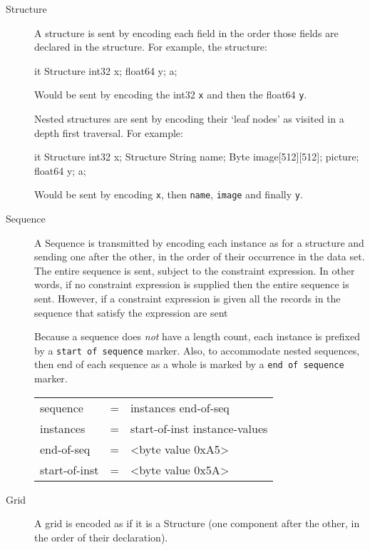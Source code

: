 \documentclass{article}
\begin{document}
\begin{description}
\item [Structure] A structure is sent by encoding each field in the order
  those fields are declared in the structure. For example, the structure:

\begin{vcode}{it}
Structure {
    int32 x;
    float64 y;
} a;
\end{vcode}

Would be sent by encoding the int32 \texttt{x} and then the float64
\texttt{y}. 

Nested structures are sent by encoding their `leaf nodes' as visited in a
depth first traversal. For example:

\begin{vcode}{it}
Structure {
    int32 x;
    Structure {
        String name;
        Byte image[512][512];
    } picture;
    float64 y;
} a;
\end{vcode}

Would be sent by encoding \texttt{x}, then \texttt{name}, \texttt{image} and
  finally \texttt{y}.

\item [Sequence] A Sequence is transmitted by encoding each instance as for a
  structure and sending one after the other, in the order of their occurrence
  in the data set. The entire sequence is sent, subject to the constraint
  expression. In other words, if no constraint expression is supplied then
  the entire sequence is sent. However, if a constraint expression is given
  all the records in the sequence that satisfy the expression are
  sent

  Because a sequence does \emph{not} have a length count, each instance
  is prefixed by a \texttt{start of sequence} marker. Also, to accommodate
  nested sequences, then end of each sequence as a whole is marked by a
  \texttt{end of sequence} marker.

\begin{ttfamily}
\begin{center}
\begin{tabular}{lll}
sequence & = & instances end-of-seq \\
instances & = & start-of-inst instance-values \\
end-of-seq & = & <byte value 0xA5> \\
start-of-inst & = & <byte value 0x5A> \\
\end{tabular}
\end{center}
\end{ttfamily}

\item [Grid] A grid is encoded as if it is a Structure (one component
  after the other, in the order of their declaration).

\end{description}
\end{document}

